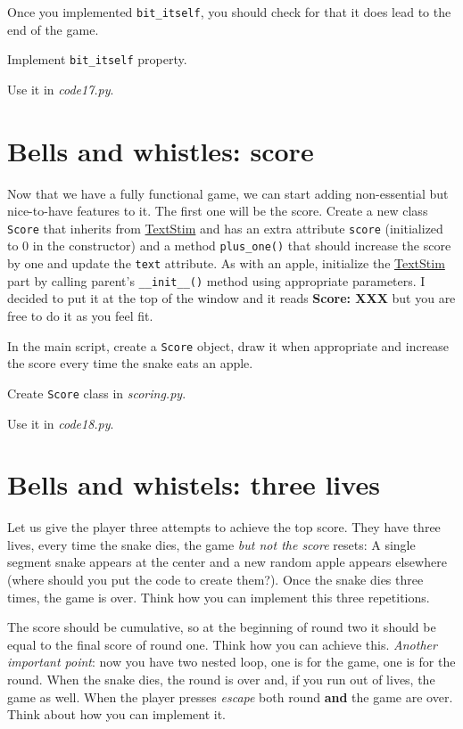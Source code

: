 \documentclass[
]{book}
\begin{document}
Once you implemented \texttt{bit\_itself}, you should check for that it does lead to the end of the game.

Implement \texttt{bit\_itself} property.

Use it in \emph{code17.py}.

\hypertarget{bells-and-whistles-score}{%
\section{Bells and whistles: score}\label{bells-and-whistles-score}}

Now that we have a fully functional game, we can start adding non-essential but nice-to-have features to it. The first one will be the score. Create a new class \texttt{Score} that inherits from \href{https://psychopy.org/api/visual/textstim.html\#psychopy.visual.TextStim}{TextStim} and has an extra attribute \texttt{score} (initialized to \(0\) in the constructor) and a method \texttt{plus\_one()} that should increase the score by one and update the \texttt{text} attribute. As with an apple, initialize the \href{https://psychopy.org/api/visual/textstim.html\#psychopy.visual.TextStim}{TextStim} part by calling parent's \texttt{\_\_init\_\_()} method using appropriate parameters. I decided to put it at the top of the window and it reads \textbf{Score: XXX} but you are free to do it as you feel fit.

In the main script, create a \texttt{Score} object, draw it when appropriate and increase the score every time the snake eats an apple.

Create \texttt{Score} class in \emph{scoring.py}.

Use it in \emph{code18.py}.

\hypertarget{bells-and-whistels-three-lives}{%
\section{Bells and whistels: three lives}\label{bells-and-whistels-three-lives}}

Let us give the player three attempts to achieve the top score. They have three lives, every time the snake dies, the game \emph{but not the score} resets: A single segment snake appears at the center and a new random apple appears elsewhere (where should you put the code to create them?). Once the snake dies three times, the game is over. Think how you can implement this three repetitions.

The score should be cumulative, so at the beginning of round two it should be equal to the final score of round one. Think how you can achieve this. \emph{Another important point}: now you have two nested loop, one is for the game, one is for the round. When the snake dies, the round is over and, if you run out of lives, the game as well. When the player presses \emph{escape} both round \textbf{and} the game are over. Think about how you can implement it.
\end{document}
